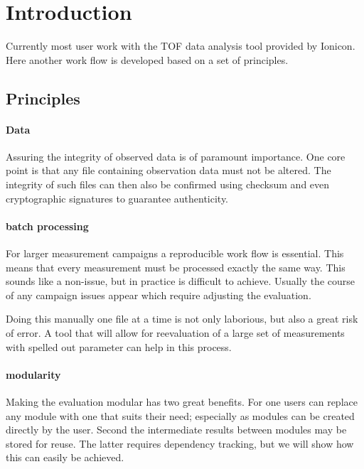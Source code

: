 \section{Introduction}

Currently most user work with the \ac{TOF} data analysis tool
\citep{Muller2013a} provided by Ionicon.  Here another work flow is
developed based on a set of principles.

\subsection{Principles}

\paragraph{Data}

Assuring the integrity of observed data is of paramount importance.  One
core point is that any file containing observation data must not be
altered.  The integrity of such files can then also be confirmed using
checksum and even cryptographic signatures to guarantee authenticity.


\paragraph{batch processing}

For larger measurement campaigns a reproducible work flow is essential.
This means that every measurement must be processed exactly the same
way.  This sounds like a non-issue, but in practice is difficult to
achieve.  Usually the course of any campaign issues appear which
require adjusting the evaluation.

Doing this manually one file at a time is not only laborious, but also a
great risk of error.  A tool that will allow for reevaluation of a large
set of measurements with spelled out parameter can help in this
process.


\paragraph{modularity}

Making the evaluation modular has two great benefits.  For one users can
replace any module with one that suits their need; especially as modules
can be created directly by the user.  Second the intermediate
results between modules may be stored for reuse.  The latter requires
dependency tracking, but we will show how this can easily be achieved.

